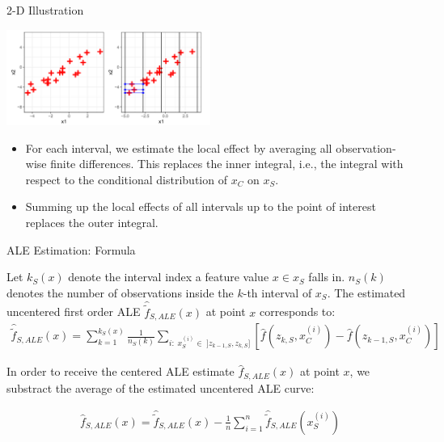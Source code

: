 \documentclass[aspectratio=169]{../latex_main/tntbeamer}  %
\begin{document}
\begin{frame}{2-D Illustration}
\vspace{-1em}
\begin{center}
\includegraphics[width=0.5\textwidth]{figure/2D01.png}
\end{center}


 \begin{itemize}
  \item For each interval, we estimate the local effect by averaging all observation-wise finite differences. This replaces the inner integral, i.e., the integral with respect to the conditional distribution of $x_C$ on $x_S$.
  \item Summing up the local effects of all intervals up to the point of interest replaces the outer integral.
\end{itemize}

\end{frame}
\begin{frame}{ALE Estimation: Formula}

Let $k_S(x)$ denote the interval index a feature value $x \in x_S$ falls in. $n_S(k)$ denotes the number of observations inside the $k$-th interval of $x_S$. The estimated uncentered first order ALE $\hat{\tilde{f}}_{S, ALE}(x)$ at point $x$ corresponds to:
$$
\begin{aligned}
\hat{\tilde{f}}_{S, ALE}(x) = \sum_{k = 1}^{k_S(x)}\frac{1}{n_S(k)}\sum_{i: \; x_S^{(i)} \in \; ]z_{k-1, S}, z_{k, S}]}\left[\hat{f}(z_{k, S}, x^{(i)}_C) -\hat{f}(z_{k-1, S}, x^{(i)}_C)\right]
\end{aligned}
$$

\pause
In order to receive the centered ALE estimate $\hat{f}_{S, ALE}(x)$ at point $x$, we substract the average of the estimated uncentered ALE curve:

$$
\begin{aligned}
\hat{f}_{S, ALE}(x) = \hat{\tilde{f}}_{S, ALE}(x) - \frac{1}{n}\sum_{i = 1}^n \hat{\tilde{f}}_{S, ALE}(x_S^{(i)})
\end{aligned}
$$

\end{frame}
\end{document}
